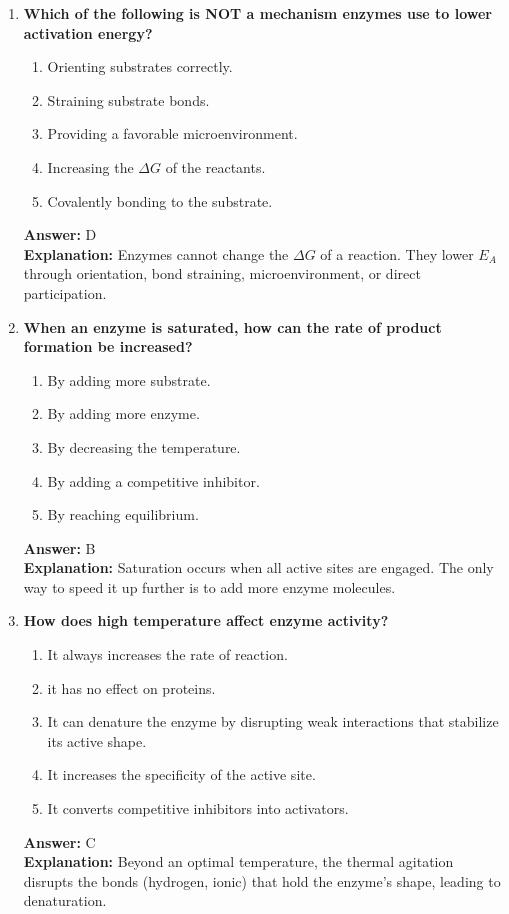 \documentclass[11pt, a4paper]{article}
\begin{document}
\begin{enumerate}[leftmargin=*, label=\arabic*.]
\item \textbf{Which of the following is NOT a mechanism enzymes use to lower activation energy?}
\begin{enumerate}[label=\Alph*.]
    \item Orienting substrates correctly.
    \item Straining substrate bonds.
    \item Providing a favorable microenvironment.
    \item Increasing the $\Delta G$ of the reactants.
    \item Covalently bonding to the substrate.
\end{enumerate}
\textbf{Answer:} D \\
\textbf{Explanation:} Enzymes cannot change the $\Delta G$ of a reaction. They lower $E_A$ through orientation, bond straining, microenvironment, or direct participation.

\item \textbf{When an enzyme is saturated, how can the rate of product formation be increased?}
\begin{enumerate}[label=\Alph*.]
    \item By adding more substrate.
    \item By adding more enzyme.
    \item By decreasing the temperature.
    \item By adding a competitive inhibitor.
    \item By reaching equilibrium.
\end{enumerate}
\textbf{Answer:} B \\
\textbf{Explanation:} Saturation occurs when all active sites are engaged. The only way to speed it up further is to add more enzyme molecules.

\item \textbf{How does high temperature affect enzyme activity?}
\begin{enumerate}[label=\Alph*.]
    \item It always increases the rate of reaction.
    \item it has no effect on proteins.
    \item It can denature the enzyme by disrupting weak interactions that stabilize its active shape.
    \item It increases the specificity of the active site.
    \item It converts competitive inhibitors into activators.
\end{enumerate}
\textbf{Answer:} C \\
\textbf{Explanation:} Beyond an optimal temperature, the thermal agitation disrupts the bonds (hydrogen, ionic) that hold the enzyme's shape, leading to denaturation.


\end{enumerate}
\end{document}
